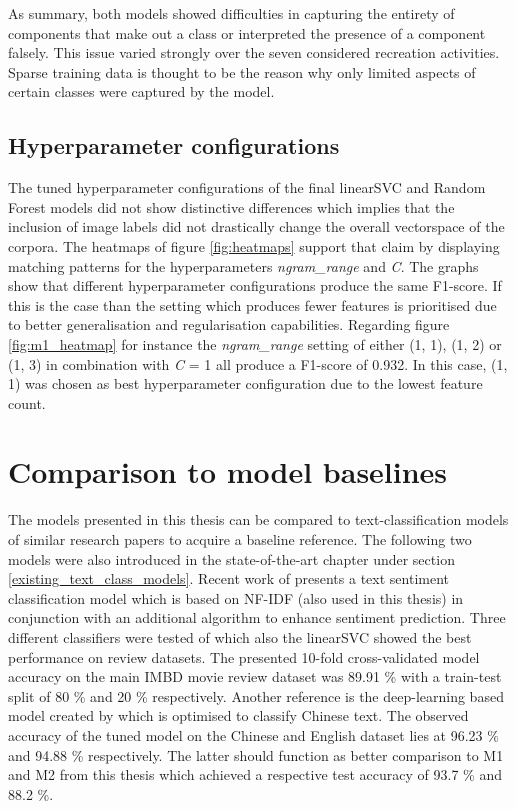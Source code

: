 As summary, both models showed difficulties in capturing the entirety of components that make out a class or interpreted the presence of a component falsely. This issue varied strongly over the seven considered recreation activities. Sparse training data is thought to be the reason why only limited aspects of certain classes were captured by the model.

\subsection{Hyperparameter configurations}
The tuned hyperparameter configurations of the final linearSVC and Random Forest models did not show distinctive differences which implies that the inclusion of image labels did not drastically change the overall vectorspace of the corpora. The heatmaps of figure \ref{fig:heatmaps} support that claim by displaying matching patterns for the hyperparameters \textit{ngram\_range} and \textit{C}. The graphs show that different hyperparameter configurations produce the same F1-score. If this is the case than the setting which produces fewer features is prioritised due to better generalisation and regularisation capabilities. Regarding figure \ref{fig:m1_heatmap} for instance the \textit{ngram\_range} setting of either (1, 1), (1, 2) or (1, 3) in combination with \textit{C} = 1 all produce a F1-score of 0.932. In this case, (1, 1) was chosen as best hyperparameter configuration due to the lowest feature count.

\section{Comparison to model baselines} \label{model_baseline}
The models presented in this thesis can be compared to text-classification models of similar research papers to acquire a baseline reference. The following two models were also introduced in the state-of-the-art chapter under section \ref{existing_text_class_models}. Recent work of \textcite{Das2018} presents a text sentiment classification model which is based on NF-IDF (also used in this thesis) in conjunction with an additional algorithm to enhance sentiment prediction. Three different classifiers were tested of which also the linearSVC showed the best performance on review datasets. The presented 10-fold cross-validated model accuracy on the main IMBD movie review dataset was 89.91 \% with a train-test split of 80 \% and 20 \% respectively. Another reference is the deep-learning based model created by \textcite{Li2018} which is optimised to classify Chinese text. The observed accuracy of the tuned model on the Chinese and English dataset lies at 96.23 \% and 94.88 \% respectively. The latter should function as better comparison to M1 and M2 from this thesis which achieved a respective test accuracy of 93.7 \% and 88.2 \%.

